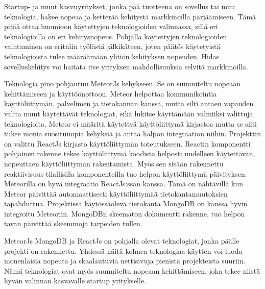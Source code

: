 \documentclass[11pt,a4paper,titlepage,oneside]{article}
\begin{document}

Startup- ja muut kasvuyritykset, jonka pää tuotteena on sovellus tai muu teknologia, hakee nopeaa ja ketterää kehitystä markkinoilla pärjäämiseen.
Tämä pitää ottaa huomioon käytettyjen teknologioiden valinnassa, sillä eri teknologioilla on eri kehitysnopeus.
Pohjalla käytettyjen teknologioiden vaihtaminen on erittäin työlästä jälkikäteen,
joten päätös käytetyistä teknologioista tulee määräämään yhtiön kehityksen nopeuden.
Hidas sovelluskehitys voi haitata itse yrityksen mahdollisuuksia selvitä markkinoilla.
\medskip




Teknologia pino pohjautuu MeteorJs kehykseen. Se on suunniteltu nopeaan kehittämiseen ja käyttöönottoon.
Meteor helpottaa kommunikointia käyttöliittymän, palvelimen ja tietokannan kanssa, 
mutta silti antaen vapauden valita muut käytettävät teknologiat, eikä lukitse käyttämään valmiiksi valittuja teknologioita.
Meteor ei määritä käytettyä käyttöliittymä kirjastoa mutta se silti tukee monia suosituimpia kehyksiä ja antaa halpon integraation niihin.
Projekttin on valittu ReactJs kirjasto käyttöliittymän toteutukseen.
Reactin komponentti pohjainen rakenne tekee käyttöliittymä koodista helposti uudelleen käytettävän, nopeuttaen käyttöliittymän rakentamista. 
Myös sen sisään rakennettu reaktiivisuus tilallisilla komponenteilla tuo helpon käyttöliittymä päivityksen.
Meteorilla on hyvä integraatio ReactJs:ssän kanssa. 
Tämä on nähtävillä kun Meteor päivittää automaattisesti käyttöliittymää tietokantamuutoksien tapahduttua. 
Projektissa käytössäoleva tietokanta MongoDB on kanssa hyvin integroitu Meteoriin.
MongoDBn skeematon dokumentti rakenne, tuo helpon tavan päivittää skeemmoja tarpeiden tullen.
\medskip



MeteorJs MongoDB ja ReactJs on pohjalla olevat teknologiat, jonka päälle projekti on rakennettu.
Yhdessä näitä kolmea teknologiaa käytten voi luoda monenlaisia nopeuta ja skaalautuvia nettisivuja pienistä projekteista suuriin.
Nämä teknologiat ovat myös suunniteltu nopeaan kehittämiseen, joka tekee niistä hyvän valinnan kasvavalle startup yritykselle.
\medskip
\end{document}
